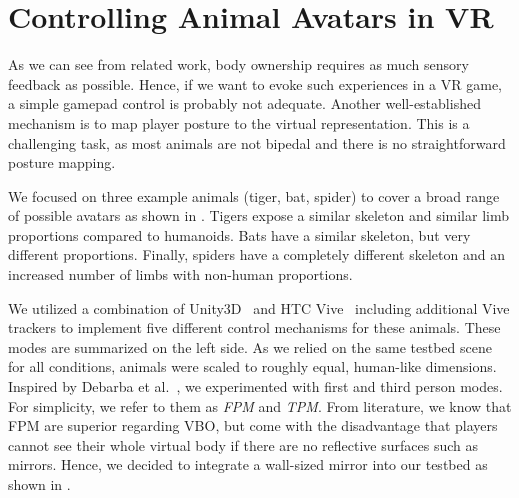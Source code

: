 \documentclass{sigchi-ext}
\begin{document}
\section{Controlling Animal Avatars in VR}


    
As we can see from related work, body ownership requires as much sensory feedback as possible. Hence, if we want to evoke such experiences in a VR game, a simple gamepad control is probably not adequate. Another well-established mechanism is to map player posture to the virtual representation. This is a challenging task, as most animals are not bipedal and there is no straightforward posture mapping. 

We focused on three example animals (tiger, bat, spider) to cover a broad range of possible avatars as shown in . Tigers expose a similar skeleton and similar limb proportions compared to humanoids. Bats have a similar skeleton, but very different proportions. Finally, spiders have a completely different skeleton and an increased number of limbs with non-human proportions.

We utilized a combination of Unity3D~\cite{unity} and HTC Vive~\cite{vive} including additional Vive trackers to implement five different control mechanisms for these animals. These modes are summarized on the left side. As we relied on the same testbed scene for all conditions, animals were scaled to roughly equal, human-like dimensions. Inspired by Debarba et al.~\cite{galvan2015characterizing}, we experimented with first and third person modes. For simplicity, we refer to them as \textit{FPM} and \textit{TPM}. From literature, we know that FPM are superior regarding VBO, but come with the disadvantage that players cannot see their whole virtual body if there are no reflective surfaces such as mirrors. Hence, we decided to integrate a wall-sized mirror into our testbed as shown in . 
\end{document}
